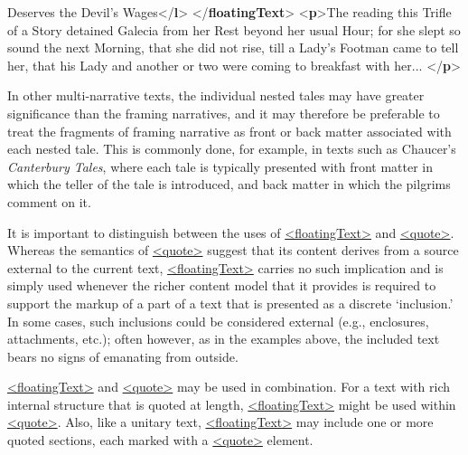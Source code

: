 \begin{shaded}
\hspace*{1em}\hspace*{1em}\hspace*{1em}Deserves the Devil's Wages{</\textbf{l}>}\mbox{}\newline 
\hspace*{1em}\hspace*{1em}\mbox{}\newline 
\hspace*{1em}\mbox{}\newline 
{}\mbox{}\newline 
{</\textbf{floatingText}>}\mbox{}\newline 
{<\textbf{p}>}The reading this Trifle of a Story detained Galecia from her Rest\mbox{}\newline 
 beyond her usual Hour; for she slept so sound the next Morning, that\mbox{}\newline 
 she did not rise, till a Lady's Footman came to tell her, that his\mbox{}\newline 
 Lady and another or two were coming to breakfast with her...\mbox{}\newline 
{</\textbf{p}>}\end{shaded}\egroup\par \par
In other multi-narrative texts, the individual nested tales may have greater significance than the framing narratives, and it may therefore be preferable to treat the fragments of framing narrative as front or back matter associated with each nested tale. This is commonly done, for example, in texts such as Chaucer's \textit{Canterbury Tales}, where each tale is typically presented with front matter in which the teller of the tale is introduced, and back matter in which the pilgrims comment on it.\par
It is important to distinguish between the uses of \hyperref[TEI.floatingText]{<floatingText>} and \hyperref[TEI.quote]{<quote>}. Whereas the semantics of \hyperref[TEI.quote]{<quote>} suggest that its content derives from a source external to the current text, \hyperref[TEI.floatingText]{<floatingText>} carries no such implication and is simply used whenever the richer content model that it provides is required to support the markup of a part of a text that is presented as a discrete ‘inclusion.’ In some cases, such inclusions could be considered external (e.g., enclosures, attachments, etc.); often however, as in the examples above, the included text bears no signs of emanating from outside.\par
\hyperref[TEI.floatingText]{<floatingText>} and \hyperref[TEI.quote]{<quote>} may be used in combination. For a text with rich internal structure that is quoted at length, \hyperref[TEI.floatingText]{<floatingText>} might be used within \hyperref[TEI.quote]{<quote>}. Also, like a unitary text, \hyperref[TEI.floatingText]{<floatingText>} may include one or more quoted sections, each marked with a \hyperref[TEI.quote]{<quote>} element.
